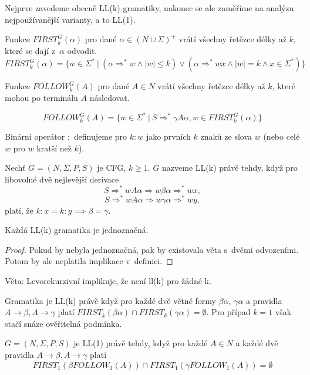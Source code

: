 
Nejprve zavedeme obecně LL(k) gramatiky, nakonec se ale zaměříme na
analýzu nejpoužívanější varianty, a to LL(1).

\begin{definition}
    Funkce $FIRST^G_k(\alpha)$ pro dané $\alpha \in (N \cup \Sigma)^+$
    vrátí všechny řetězce délky až $k$, které se dají z~$\alpha$
    odvodit.
	\[
		FIRST^G_k(\alpha)= \{ w \in \Sigma^*~|~(\alpha \Rightarrow^* w \land |w| \leq k) \lor (\alpha \Rightarrow^* wx \land |w| = k \land x \in \Sigma^*) \}
	\]

    Funkce $FOLLOW^G_k(A)$ pro dané $A \in N$
    vrátí všechny řetězce délky až $k$, které mohou po terminálu $A$
    následovat.

	\[
		FOLLOW^G_k(A) = \{ w \in \Sigma^*~|~S \Rightarrow^* \gamma A \alpha, w \in FIRST^G_k(\alpha) \}
	\]

    Binární operátor ${:}$ definujeme pro $k : w$ jako prvních $k$ znaků
    ze slova $w$ (nebo celé $w$ pro $w$ kratší než $k$).
\end{definition}

\begin{definition}[LL(k) gramatiky]
    Nechť $G = (N, \Sigma, P, S)$ je CFG, $k \geq 1$. $G$ nazveme LL(k)
    právě tehdy, když pro libovolné dvě nejlevější derivace
	\[
		S \Rightarrow^* wA\alpha \Rightarrow w\beta\alpha \Rightarrow^* wx,
	\]
    \[ 
		S \Rightarrow^* wA\alpha \Rightarrow w\gamma\alpha \Rightarrow^* wy,
	\]
    platí, že $k : x = k : y \implies \beta = \gamma$.
\end{definition}

\begin{theorem}
    Každá LL(k) gramatika je jednoznačná.
\end{theorem}

\begin{proof}
Pokud by nebyla jednoznačná, pak by existovala věta s~dvěmi odvozeními.
Potom by ale neplatila implikace v~definici.
\end{proof}

Věta: Levorekurzivní implikuje, že není ll(k) pro žádné k.

Gramatika je LL(k) právě když pro každé dvě větné formy $\beta \alpha$,
$\gamma \alpha$ a pravidla $A \to \beta, A \to \gamma$
platí $FIRST_k(\beta \alpha) \cap FIRST_k(\gamma \alpha) = \emptyset$.
Pro případ $k = 1$ však stačí snáze ověřitelná podmínka.

\begin{theorem}
    $G = (N, \Sigma, P, S)$ je LL(1) právě tehdy, když
    pro každé $A \in N$
    a každé dvě pravidla $A \to \beta, A \to \gamma$
    platí
    \[
        FIRST_1(\beta FOLLOW_1(A)) \cap FIRST_1(\gamma FOLLOW_1(A)) = \emptyset
    \]
\end{theorem}

